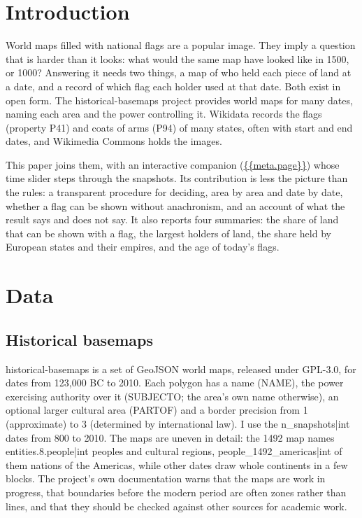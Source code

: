 \documentclass[11pt,a4paper]{article}
\begin{document}
\section{Introduction}
World maps filled with national flags are a popular image. They imply a question that is harder than it looks: what would the same map have looked like in 1500, or 1000? Answering it needs two things, a map of who held each piece of land at a date, and a record of which flag each holder used at that date. Both exist in open form. The historical-basemaps project \citep{ourednik} provides world maps for many dates, naming each area and the power controlling it. Wikidata \citep{wikidata} records the flags (property P41) and coats of arms (P94) of many states, often with start and end dates, and Wikimedia Commons holds the images.

This paper joins them, with an interactive companion (\url{{{meta.page}}}) whose time slider steps through the snapshots. Its contribution is less the picture than the rules: a transparent procedure for deciding, area by area and date by date, whether a flag can be shown without anachronism, and an account of what the result says and does not say. It also reports four summaries: the share of land that can be shown with a flag, the largest holders of land, the share held by European states and their empires, and the age of today's flags.

\section{Data}
\subsection{Historical basemaps}
historical-basemaps \citep{ourednik} is a set of GeoJSON world maps, released under GPL-3.0, for dates from 123{,}000 BC to 2010. Each polygon has a name (NAME), the power exercising authority over it (SUBJECTO; the area's own name otherwise), an optional larger cultural area (PARTOF) and a border precision from 1 (approximate) to 3 (determined by international law). I use the {{n_snapshots|int}} dates from 800 to 2010. The maps are uneven in detail: the 1492 map names {{entities.8.people|int}} peoples and cultural regions, {{people_1492_americas|int}} of them nations of the Americas, while other dates draw whole continents in a few blocks. The project's own documentation warns that the maps are work in progress, that boundaries before the modern period are often zones rather than lines, and that they should be checked against other sources for academic work.
\end{document}
